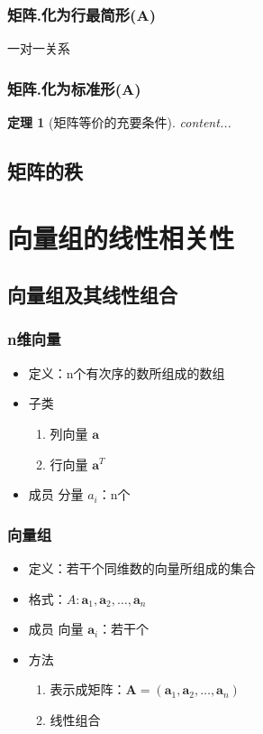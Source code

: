 \documentclass[UTF8,a4paper,12pt,scheme=chinese]{ctexbook}
\newtheorem{theorem}{定理}[section]
\begin{document}
	\subsection{矩阵.化为行最简形($ \boldsymbol{A} $)}
	一对一关系
	\subsection{矩阵.化为标准形($ \boldsymbol{A} $)}
	\begin{theorem}[矩阵等价的充要条件]
		content...
	\end{theorem}
	\section{矩阵的秩}
	\chapter{向量组的线性相关性}
	\section{向量组及其线性组合}
	\subsection{n维向量}
	\begin{itemize}
		\item 定义：n个有次序的数所组成的数组
		\item 子类
		\begin{enumerate}
			\item 列向量 $\boldsymbol{a}$
			\item 行向量 $\boldsymbol{a}^T$
		\end{enumerate}
		\item 成员
		\subitem 分量 $a_i$：n个
	\end{itemize}
	\subsection{向量组}
	\begin{itemize}
		\item 定义：若干个同维数的向量所组成的集合
		\item 格式：$A:\boldsymbol{a}_1,\boldsymbol{a}_2,\dots,\boldsymbol{a}_n$
		\item 成员
		\subitem 向量 $\boldsymbol{a}_i$：若干个
		\item 方法
		\begin{enumerate}
			\item 表示成矩阵：$\boldsymbol{A} = (\boldsymbol{a}_1,\boldsymbol{a}_2,\dots,\boldsymbol{a}_n)$
			\item 线性组合
		\end{enumerate}
	\end{itemize}
\end{document}
